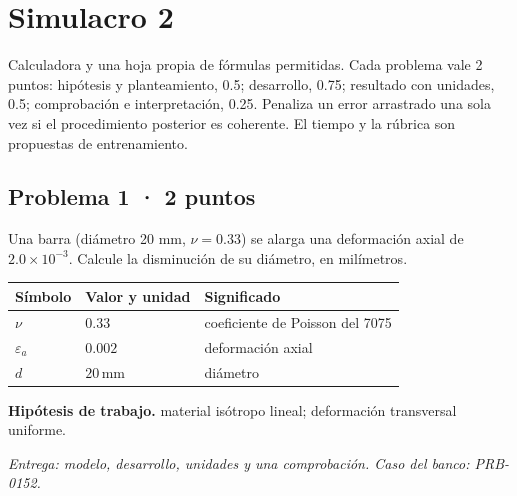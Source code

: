 \chapter{Simulacro 2}


Calculadora y una hoja propia de fórmulas permitidas. Cada problema vale 2 puntos: hipótesis y planteamiento, 0.5; desarrollo, 0.75; resultado con unidades, 0.5; comprobación e interpretación, 0.25. Penaliza un error arrastrado una sola vez si el procedimiento posterior es coherente. El tiempo y la rúbrica son propuestas de entrenamiento.

\par\medskip\noindent\begin{minipage}{\linewidth}

\section{Problema 1 · 2 puntos}

Una barra (diámetro 20 mm, $\nu = 0.33$) se alarga una deformación axial de $2.0\times 10^{-3}$. Calcule la disminución de su diámetro, en milímetros.

\par\medskip\noindent\begin{tabular}{@{}p{.18\linewidth}p{.26\linewidth}p{.48\linewidth}@{}}
\toprule Símbolo & Valor y unidad & Significado\\\midrule
$\nu$ & $0.33$ & coeficiente de Poisson del 7075\\
$\varepsilon_a$ & $0.002$ & deformación axial\\
$d$ & $20\,\mathrm{mm}$ & diámetro\\
\bottomrule\end{tabular}\par\medskip



\par\textbf{Hipótesis de trabajo.} material isótropo lineal; deformación transversal uniforme.

\par\textit{Entrega: modelo, desarrollo, unidades y una comprobación. Caso del banco: PRB-0152.}\end{minipage}\par\medskip

